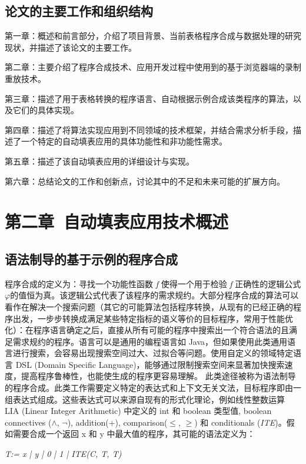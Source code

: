 \documentclass[design, pageheader]{njubachelor}
\begin{document}
\subsection{论文的主要工作和组织结构}

第一章：概述和前言部分，介绍了项目背景、当前表格程序合成与数据处理的研究现状，并描述了该论文的主要工作。

第二章：主要介绍了程序合成技术、应用开发过程中使用到的基于浏览器端的录制重放技术。

第三章：描述了用于表格转换的程序语言、自动根据示例合成该类程序的算法，以及它们的具体实现。

第四章：描述了将算法实现应用到不同领域的技术框架，并结合需求分析手段，描述了一个特定的自动填表应用的具体功能性和非功能性需求。

第五章：描述了该自动填表应用的详细设计与实现。

第六章：总结论文的工作和创新点，讨论其中的不足和未来可能的扩展方向。

\section{第二章~自动填表应用技术概述}

\subsection{语法制导的基于示例的程序合成}
程序合成的定义为：寻找一个功能性函数 {\itshape f} 使得一个用于检验 {\itshape f} 正确性的逻辑公式$\varphi$的值恒为真。该逻辑公式代表了该程序的需求规约。\cite{alur13}大部分程序合成的算法可以看作在解决一个搜索问题（其它的可能算法包括程序转换，从现有的已经正确的程序出发，一步步转换成满足某些特定指标的语义等价的目标程序，常用于性能优化\cite{schkufza16}）：在程序语言确定之后，直接从所有可能的程序中搜索出一个符合语法的且满足需求规约的程序。语言可以是通用的编程语言如 Java，但如果使用此类通用语言进行搜索，会容易出现搜索空间过大、过拟合等问题。使用自定义的领域特定语言 DSL (Domain Specific Language)，能够通过限制搜索空间来显著加快搜索速度，提高程序鲁棒性，也能使生成的程序更容易理解。\cite{alur13} 此类途径被称为语法制导的程序合成。此类工作需要定义特定的表达式和上下文无关文法，目标程序即由一组表达式组成。这些表达式可以来源自现有的形式化理论，例如线性整数运算 LIA (Linear Integer Arithmetic) 中定义的 int 和 boolean 类型值, boolean connectives ($\wedge$, $\neg$), addition(+), comparison($\leq$, $\geq$) 和 conditionals ({\itshape ITE})。假如需要合成一个返回 x 和 y 中最大值的程序，其可能的语法定义为：

{\itshape T:= x | y | 0 | 1  | ITE(C, T, T)}
\end{document}
